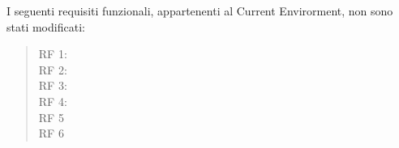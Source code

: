 \begin{list}{-}{}
	\item{I seguenti requisiti funzionali, appartenenti al Current Envirorment, non sono stati modificati:}	
\end{list}
\begin{quote}	
	\begin{description}		
		\item[RF 1:]				
		
		\item[RF 2:]				
		
		\item[RF 3:]				
		\item[RF 4:]	
		\item[RF 5]	
		\begin{list}{}{}
		\end{list}
		\item[RF 6]	
		\begin{list}{}{}
		\end{list}
		
	
	\end{description}
\end{quote}

